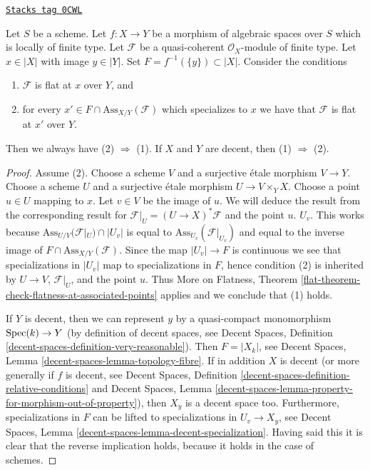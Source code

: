 \begin{theorem}
\label{spaces-flat-theorem-check-flatness-at-associated-points}
\href{https://stacks.math.columbia.edu/tag/0CWL}{\texttt{Stacks tag 0CWL}}

Let $S$ be a scheme.
Let $f : X \to Y$ be a morphism of algebraic spaces over $S$
which is locally of finite type.
Let $\mathcal{F}$ be a quasi-coherent $\mathcal{O}_X$-module of finite type.
Let $x \in |X|$ with image $y \in |Y|$.
Set $F = f^{-1}(\{y\}) \subset |X|$.
Consider the conditions
\begin{enumerate}
\item $\mathcal{F}$ is flat at $x$ over $Y$, and
\item for every $x' \in F \cap \text{Ass}_{X/Y}(\mathcal{F})$ which
specializes to $x$ we have that $\mathcal{F}$ is flat at $x'$ over $Y$.
\end{enumerate}
Then we always have (2) $\Rightarrow$ (1). If $X$ and $Y$ are
decent, then (1) $\Rightarrow$ (2).
\end{theorem}

\begin{proof}
Assume (2).
Choose a scheme $V$ and a surjective \'etale morphism $V \to Y$.
Choose a scheme $U$ and a surjective \'etale morphism $U \to V \times_Y X$.
Choose a point $u \in U$ mapping to $x$. Let $v \in V$ be the image of $u$.
We will deduce the result from the corresponding result for
$\mathcal{F}|_U = (U \to X)^*\mathcal{F}$ and the point $u$.
$U_v$. This works because $\text{Ass}_{U/V}(\mathcal{F}|_U) \cap |U_v|$
is equal to $\text{Ass}_{U_v}(\mathcal{F}|_{U_v})$ and equal to the inverse
image of $F \cap \text{Ass}_{X/Y}(\mathcal{F})$.
Since the map $|U_v| \to F$ is continuous we see that
specializations in $|U_v|$ map to specializations in $F$,
hence condition (2) is inherited by $U \to V$,
$\mathcal{F}|_U$, and the point $u$.
Thus More on Flatness, Theorem
\ref{flat-theorem-check-flatness-at-associated-points} applies
and we conclude that (1) holds.

\medskip\noindent
If $Y$ is decent, then we can represent
$y$ by a quasi-compact monomorphism $\operatorname{Spec}(k) \to Y$
(by definition of decent spaces, see
Decent Spaces, Definition \ref{decent-spaces-definition-very-reasonable}).
Then $F = |X_k|$, see
Decent Spaces, Lemma \ref{decent-spaces-lemma-topology-fibre}.
If in addition $X$ is decent (or more generally if $f$ is decent, see
Decent Spaces, Definition \ref{decent-spaces-definition-relative-conditions}
and Decent Spaces, Lemma
\ref{decent-spaces-lemma-property-for-morphism-out-of-property}),
then $X_y$ is a decent space too. Furthermore, specializations in
$F$ can be lifted to specializations
in $U_v \to X_y$, see
Decent Spaces, Lemma \ref{decent-spaces-lemma-decent-specialization}.
Having said this it is clear that the reverse implication
holds, because it holds in the case of schemes.
\end{proof}

